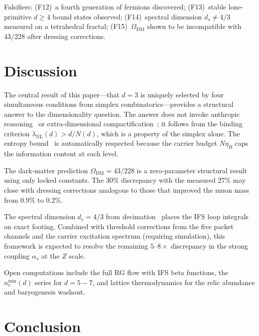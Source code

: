 \documentclass[11pt,twocolumn]{article}
\begin{document}
Falsifiers:
(F12)~a fourth generation of fermions discovered;
(F13)~stable lone-primitive $d\geq 4$ bound states observed;
(F14)~spectral dimension $d_s\neq 4/3$ measured on a tetrahedral fractal;
(F15)~$\Omega_{\mathrm{DM}}$ shown to be incompatible with $43/228$ after dressing corrections.

\section{Discussion}
\label{sec:discussion}

The central result of this paper---that $d=3$ is uniquely selected by four simultaneous conditions from simplex combinatorics---provides a structural answer to the dimensionality question.
The answer does not invoke anthropic reasoning~\cite{weinberg1987} or extra-dimensional compactification~\cite{polyakov1987}; it follows from the binding criterion $\lambda_{\mathrm{NL}}(d)>d/N(d)$, which is a property of the simplex alone.
The entropy bound~\cite{bekenstein1973} is automatically respected because the carrier budget $N\eta_R$ caps the information content at each level.

The dark-matter prediction $\Omega_{\mathrm{DM}}=43/228$ is a zero-parameter structural result using only locked constants.
The $30\%$ discrepancy with the measured $27\%$ may close with dressing corrections analogous to those that improved the muon mass from $0.9\%$ to $0.2\%$.

The spectral dimension $d_s=4/3$ from decimation~\cite{rammal1984} places the IFS loop integrals on exact footing.
Combined with threshold corrections from the five packet channels and the carrier excitation spectrum (requiring simulation), this framework is expected to resolve the remaining $5$--$8\times$ discrepancy in the strong coupling $\alpha_s$ at the $Z$ scale.

Open computations include the full RG flow with IFS beta functions, the $n_c^{\min}(d)$ series for $d=5{-}7$, and lattice thermodynamics for the relic abundance and baryogenesis washout.

\section{Conclusion}
\label{sec:conclusion}
\end{document}
